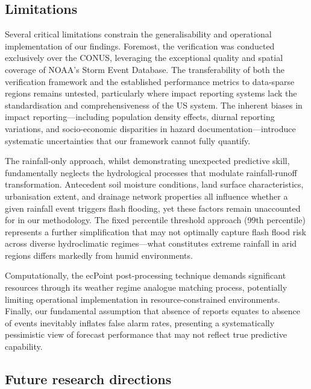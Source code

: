
\subsection{Limitations}

Several critical limitations constrain the generalisability and operational implementation of our findings. Foremost, the verification was conducted exclusively over the CONUS, leveraging the exceptional quality and spatial coverage of NOAA's Storm Event Database. The transferability of both the verification framework and the established performance metrics to data-sparse regions remains untested, particularly where impact reporting systems lack the standardisation and comprehensiveness of the US system. The inherent biases in impact reporting—including population density effects, diurnal reporting variations, and socio-economic disparities in hazard documentation—introduce systematic uncertainties that our framework cannot fully quantify.

The rainfall-only approach, whilst demonstrating unexpected predictive skill, fundamentally neglects the hydrological processes that modulate rainfall-runoff transformation. Antecedent soil moisture conditions, land surface characteristics, urbanisation extent, and drainage network properties all influence whether a given rainfall event triggers flash flooding, yet these factors remain unaccounted for in our methodology. The fixed percentile threshold approach (99th percentile) represents a further simplification that may not optimally capture flash flood risk across diverse hydroclimatic regimes—what constitutes extreme rainfall in arid regions differs markedly from humid environments.

Computationally, the ecPoint post-processing technique demands significant resources through its weather regime analogue matching process, potentially limiting operational implementation in resource-constrained environments. Finally, our fundamental assumption that absence of reports equates to absence of events inevitably inflates false alarm rates, presenting a systematically pessimistic view of forecast performance that may not reflect true predictive capability.

\subsection{Future research directions}

